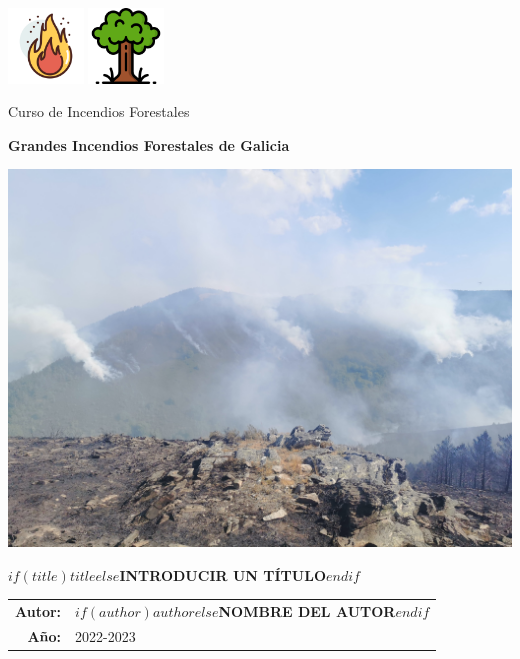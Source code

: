 


\centering


\begin{titlepage}


  \includegraphics[height=2cm]{01_images/llama.png}
  \hfill
  \includegraphics[height=2cm]{01_images/arbol.png}

  \vspace{1cm}
  
  {\LARGE{Curso de Incendios Forestales}}
  
  \vspace{2cm}
  
  \textbf{\LARGE Grandes Incendios Forestales de Galicia}
  
  \vspace{1cm}
  
  \includegraphics[height=10cm]{01_images/incendio.jpg}
  
  \vspace{1cm}
  
  $if(title)${\Huge\textbf{$title$}}$else${\Huge\textbf{INTRODUCIR UN TÍTULO}}$endif$
  
  \vfill
  
  \begin{tabular}{ r l }
    \textbf{Autor:} & $if(author)${$author$}$else${\textbf{NOMBRE DEL AUTOR}}$endif$ \\
    \textbf{Año:} & 2022-2023 \\
  \end{tabular}



\end{titlepage}